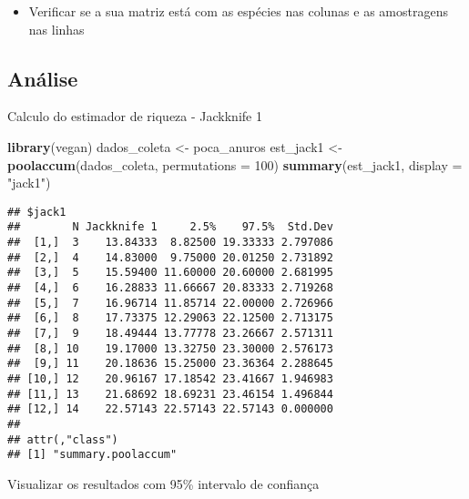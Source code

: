 \documentclass[
]{book}
\newenvironment{Shaded}{\begin{snugshade}}{\end{snugshade}}
\newcommand{\DataTypeTok}[1]{\textcolor[rgb]{0.13,0.29,0.53}{#1}}
\newcommand{\DecValTok}[1]{\textcolor[rgb]{0.00,0.00,0.81}{#1}}
\newcommand{\KeywordTok}[1]{\textcolor[rgb]{0.13,0.29,0.53}{\textbf{#1}}}
\newcommand{\NormalTok}[1]{#1}
\newcommand{\StringTok}[1]{\textcolor[rgb]{0.31,0.60,0.02}{#1}}
\providecommand{\tightlist}{%
  \setlength{\itemsep}{0pt}\setlength{\parskip}{0pt}}
\begin{document}
\begin{itemize}
\tightlist
\item
  Verificar se a sua matriz está com as espécies nas colunas e as amostragens nas linhas
\end{itemize}

\hypertarget{anuxe1lise-3}{%
\subsection{Análise}\label{anuxe1lise-3}}

Calculo do estimador de riqueza - Jackknife 1

\begin{Shaded}
\begin{Highlighting}[]
\KeywordTok{library}\NormalTok{(vegan)}
\NormalTok{dados_coleta <-}\StringTok{ }\NormalTok{poca_anuros}
\NormalTok{est_jack1 <-}\StringTok{ }\KeywordTok{poolaccum}\NormalTok{(dados_coleta, }\DataTypeTok{permutations =} \DecValTok{100}\NormalTok{)}
\KeywordTok{summary}\NormalTok{(est_jack1, }\DataTypeTok{display =} \StringTok{"jack1"}\NormalTok{)}
\end{Highlighting}
\end{Shaded}

\begin{verbatim}
## $jack1
##        N Jackknife 1     2.5%    97.5%  Std.Dev
##  [1,]  3    13.84333  8.82500 19.33333 2.797086
##  [2,]  4    14.83000  9.75000 20.01250 2.731892
##  [3,]  5    15.59400 11.60000 20.60000 2.681995
##  [4,]  6    16.28833 11.66667 20.83333 2.719268
##  [5,]  7    16.96714 11.85714 22.00000 2.726966
##  [6,]  8    17.73375 12.29063 22.12500 2.713175
##  [7,]  9    18.49444 13.77778 23.26667 2.571311
##  [8,] 10    19.17000 13.32750 23.30000 2.576173
##  [9,] 11    20.18636 15.25000 23.36364 2.288645
## [10,] 12    20.96167 17.18542 23.41667 1.946983
## [11,] 13    21.68692 18.69231 23.46154 1.496844
## [12,] 14    22.57143 22.57143 22.57143 0.000000
## 
## attr(,"class")
## [1] "summary.poolaccum"
\end{verbatim}

Visualizar os resultados com 95\% intervalo de confiança
\end{document}
